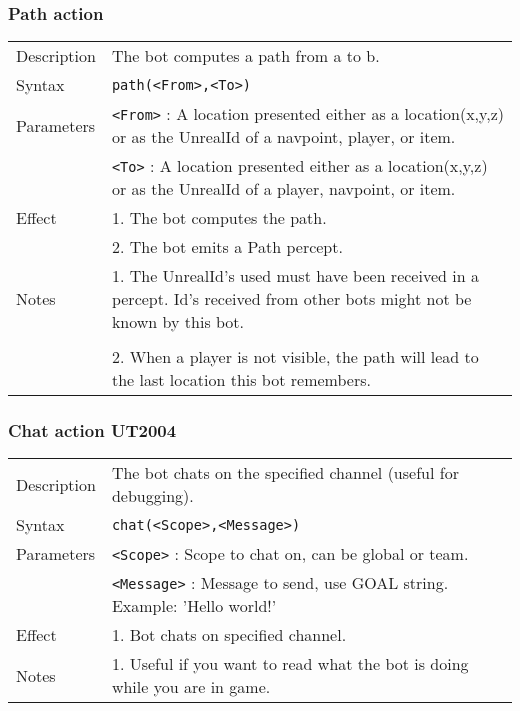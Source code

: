 \documentclass[11pt,a4paper]{article}
\begin{document}
\subsubsection*{Path action} 	
\begin{small}
\begin{tabular}{p{2cm}p{9cm}}
Description & The bot computes a path from a to b.\\
Syntax & \verb|path(<From>,<To>)|\\
Parameters 	& \verb|<From>| : A location presented either as a location(x,y,z) or as the UnrealId of a navpoint, player, or item.\\
	 	& \verb|<To>| :  A location presented either as a location(x,y,z) or as the UnrealId of a player, navpoint, or item.\\
Effect & 
		1.	The bot computes the path.\\
	&	2.	The bot emits a Path percept.\\
Notes& 
		1.	The UnrealId's used must have been received in a percept. Id's received from other bots might not be known by this bot. \\\\
	&	2.	When a player is not visible, the path will lead to the last location this bot remembers.\\
\end{tabular}
\end{small}

\subsubsection*{Chat action UT2004} 	
\begin{small}
    \begin{tabular}{p{2cm}p{9cm}}
        Description & The bot chats on the specified channel (useful for debugging).\\
        Syntax & \verb|chat(<Scope>,<Message>)|\\
        Parameters & \verb|<Scope>| : Scope to chat on, can be global or team.\\
            & \verb|<Message>| : Message to send, use GOAL string. Example: 'Hello world!'\\
        Effect &
            1. Bot chats on specified channel.\\
        Notes & 
            1. Useful if you want to read what the bot is doing while you are in game.\\
    \end{tabular}
\end{small}
\end{document}
